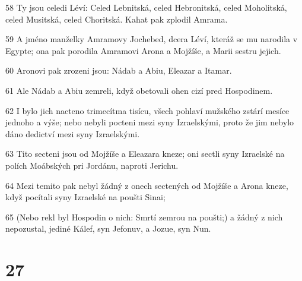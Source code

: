 \par 58 Ty jsou celedi Léví: Celed Lebnitská, celed Hebronitská, celed Moholitská, celed Musitská, celed Choritská. Kahat pak zplodil Amrama.
\par 59 A jméno manželky Amramovy Jochebed, dcera Léví, kteráž se mu narodila v Egypte; ona pak porodila Amramovi Arona a Mojžíše, a Marii sestru jejich.
\par 60 Aronovi pak zrozeni jsou: Nádab a Abiu, Eleazar a Itamar.
\par 61 Ale Nádab a Abiu zemreli, když obetovali ohen cizí pred Hospodinem.
\par 62 I bylo jich nacteno trimecítma tisícu, všech pohlaví mužského zstárí mesíce jednoho a výše; nebo nebyli pocteni mezi syny Izraelskými, proto že jim nebylo dáno dedictví mezi syny Izraelskými.
\par 63 Tito secteni jsou od Mojžíše a Eleazara kneze; oni sectli syny Izraelské na polích Moábských pri Jordánu, naproti Jerichu.
\par 64 Mezi temito pak nebyl žádný z onech sectených od Mojžíše a Arona kneze, když pocítali syny Izraelské na poušti Sinai;
\par 65 (Nebo rekl byl Hospodin o nich: Smrtí zemrou na poušti;) a žádný z nich nepozustal, jediné Kálef, syn Jefonuv, a Jozue, syn Nun.

\chapter{27}

